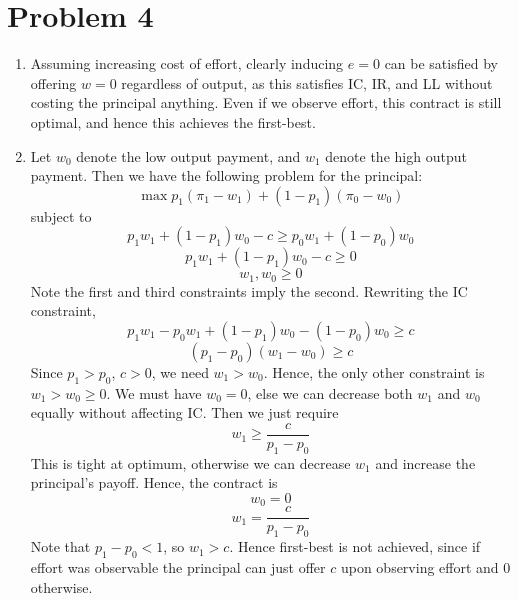 \documentclass[10pt,letter]{article}
\begin{document}
\section*{Problem 4}
\begin{enumerate}[label=(\alph*)]
\item Assuming increasing cost of effort, clearly inducing $e = 0$ can be satisfied by offering $w = 0$ regardless of output, as this satisfies IC, IR, and LL without costing the principal anything. Even if we observe effort, this contract is still optimal, and hence this achieves the first-best.
\item Let $w_0$ denote the low output payment, and $w_1$ denote the high output payment. Then we have the following problem for the principal:
\[ \max p_1(\pi_1 - w_1) + (1-p_1)(\pi_0 - w_0) \]
subject to
\[ p_1 w_1 + (1-p_1)w_0 - c \ge p_0 w_1 + (1-p_0)w_0  \]
\[ p_1 w_1 + (1-p_1)w_0 - c \ge 0  \]
\[ w_1, w_0 \ge 0 \]
Note the first and third constraints imply the second. Rewriting the IC constraint,
\[ p_1 w_1 - p_0 w_1 + (1-p_1)w_0 - (1-p_0)w_0 \ge  c   \]
\[ (p_1 - p_0) (w_1 - w_0) \ge  c   \]
Since $p_1 > p_0$, $c > 0$, we need $w_1 > w_0$. Hence, the only other constraint is $w_1 > w_0 \ge 0$. We must have $w_0 = 0$, else we can decrease both $w_1$ and $w_0$ equally without affecting IC. Then we just require
\[ w_1 \ge \frac{c}{p_1 - p_0} \]
This is tight at optimum, otherwise we can decrease $w_1$ and increase the principal's payoff. Hence, the contract is
\[ w_0 = 0 \]
\[ w_1 = \frac{c}{p_1 - p_0} \]
Note that $p_1 - p_0 < 1$, so $w_1 > c$. Hence first-best is not achieved, since if effort was observable the principal can just offer $c$ upon observing effort and 0 otherwise.
\end{enumerate}
\end{document}

